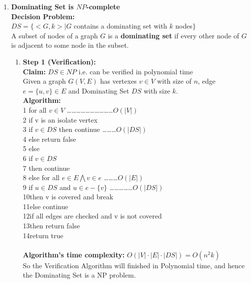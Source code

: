 \documentclass{article}
\newcommand{\add}[1]{\textcolor{dkgreen}{#1}}
\begin{document}
\begin{enumerate}
   \item{\textbf{Dominating Set is $NP$-complete}} \\
   \textbf{Decision Problem:}\\
 $DS =\{<G,k>| G$ contains a dominating set with $k$ nodes$\}$\\
 A subset of nodes of a graph $G$ is a \textbf{dominating set} if every other node of $G$ is adjacent to some node in the subset.\\

  \begin{enumerate}
   \item\textbf{Step 1 (Verification): }\\
		 \textbf{Claim:} $DS \in NP$ i.e. can be verified in polynomial time\\
    Given a graph $G(V,E)$ has vertexes $v\in V$ with size of $n$, edge $e=\{u,v\} \in E$ and Dominating Set $DS$ with size $k$.\\
    \textbf{Algorithm: }\\
    1 \quad for all $v\in V$ \dots\dots\dots\dots\dots\dots\dots\dots\dots\dots $O(|V|)$\\
    2 \quad\quad\quad if v is an isolate vertex\\
    3 \quad\quad\quad\quad\quad if $v\in DS$ then continue \dots\dots\dots  $O(|DS|)$\\
    4 \quad\quad\quad\quad\quad else return false\\
    5 \quad\quad\quad else\\
    6 \quad\quad\quad\quad\quad if $v\in DS$\\
    7 \quad\quad\quad\quad\quad\quad\quad then continue\\
    8 \quad\quad\quad\quad\quad else for all $e\in E \bigwedge v\in e$ \dots\dots\dots $O(|E|)$\\
    9 \quad\quad\quad\quad\quad\quad\quad if \add{ $u \in DS $ and }$u\in e-\{v\}$  \dots\dots\dots\dots\dots $O(|DS|)$\\
    10\quad\quad\quad\quad\quad\quad\quad\quad\quad then v is covered and break\\
    11\quad\quad\quad\quad\quad\quad\quad else continue\\
    12\quad\quad\quad\quad\quad\quad\quad if all edges are checked and v is not covered\\
    13\quad\quad\quad\quad\quad\quad\quad\quad\quad then return false\\
    14\quad return true\\ \\
    \textbf{Algorithm's time complexity: } $O(|V|\cdot |E|\cdot |DS|)=O(n^2k)$ \\
    So the Verification Algorithm will finished in Polynomial time, and hence the Dominating Set is a NP problem.


\end{enumerate}
\end{enumerate}
\end{document}
